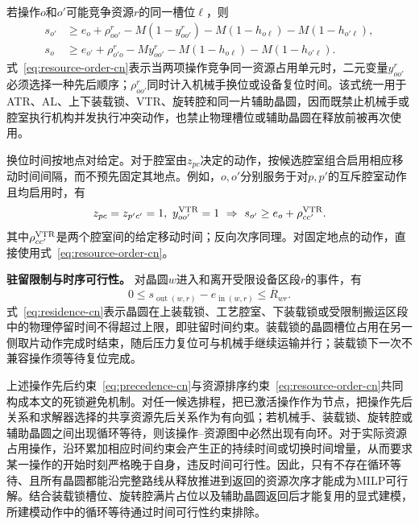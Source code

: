 \documentclass[final,5p,times,twocolumn]{elsarticle}
\begin{document}
若操作$o$和$o'$可能竞争资源$r$的同一槽位$\ell$，则
\begin{equation}
\begin{aligned}
s_{o'}&\ge e_o+\rho^r_{oo'}-M(1-y^r_{oo'})
-M(1-h_{o\ell})-M(1-h_{o'\ell}),\\
s_o&\ge e_{o'}+\rho^r_{o'o}-My^r_{oo'}
-M(1-h_{o\ell})-M(1-h_{o'\ell}).
\end{aligned}
\label{eq:resource-order-cn}
\end{equation}
式~\eqref{eq:resource-order-cn}表示当两项操作竞争同一资源占用单元时，二元变量$y^r_{oo'}$必须选择一种先后顺序；$\rho^r_{oo'}$同时计入机械手换位或设备复位时间。该式统一用于ATR、AL、上下装载锁、VTR、旋转腔和同一片辅助晶圆，因而既禁止机械手或腔室执行机构并发执行冲突动作，也禁止物理槽位或辅助晶圆在释放前被再次使用。

换位时间按地点对给定。对于腔室由$z_{pc}$决定的动作，按候选腔室组合启用相应移动时间间隔，而不预先固定其地点。例如，$o,o'$分别服务于对$p,p'$的互斥腔室动作且均启用时，有
\begin{equation}
\begin{aligned}
z_{pc}=z_{p'c'}=1,\ y^{\rm VTR}_{oo'}=1
\ \Rightarrow\ s_{o'}\ge e_o+\rho^{\rm VTR}_{cc'}.
\end{aligned}
\label{eq:location-travel-cn}
\end{equation}
其中$\rho^{\rm VTR}_{cc'}$是两个腔室间的给定移动时间；反向次序同理。对固定地点的动作，直接使用式~\eqref{eq:resource-order-cn}。

\noindent\textbf{驻留限制与时序可行性。}
对晶圆$w$进入和离开受限设备区段$r$的事件，有
\begin{equation}
0\le s_{\operatorname{out}(w,r)}-e_{\operatorname{in}(w,r)}
\le\overline R_{wr}.
\label{eq:residence-cn}
\end{equation}
式~\eqref{eq:residence-cn}表示晶圆在上装载锁、工艺腔室、下装载锁或受限制搬运区段中的物理停留时间不得超过上限，即驻留时间约束。装载锁的晶圆槽位占用在另一侧取片动作完成时结束，随后压力复位可与机械手继续运输并行；装载锁下一次不兼容操作须等待复位完成。

上述操作先后约束~\eqref{eq:precedence-cn}与资源排序约束~\eqref{eq:resource-order-cn}共同构成本文的死锁避免机制。对任一候选排程，把已激活操作作为节点，把操作先后关系和求解器选择的共享资源先后关系作为有向弧；若机械手、装载锁、旋转腔或辅助晶圆之间出现循环等待，则该操作--资源图中必然出现有向环。对于实际资源占用操作，沿环累加相应时间约束会产生正的持续时间或切换时间增量，从而要求某一操作的开始时刻严格晚于自身，违反时间可行性。因此，只有不存在循环等待、且所有晶圆都能沿完整路线从释放推进到返回的资源次序才能成为MILP可行解。结合装载锁槽位、旋转腔满片占位以及辅助晶圆返回后才能复用的显式建模，所建模动作中的循环等待通过时间可行性约束排除。
\end{document}
